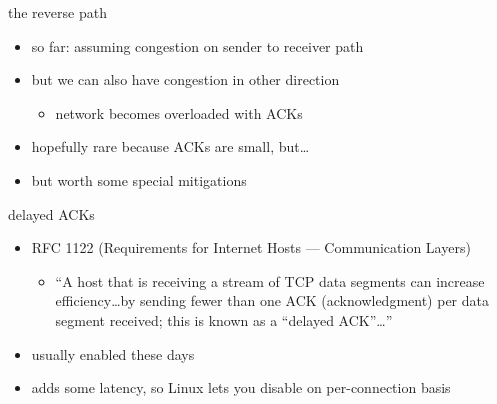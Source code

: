 \begin{frame}{the reverse path}
    \begin{itemize}
    \item so far: assuming congestion on sender to receiver path
    \item but we can also have congestion in other direction
        \begin{itemize}
        \item network becomes overloaded with ACKs
        \end{itemize}
    \item hopefully rare because ACKs are small, but\ldots
    \item but worth some special mitigations
    \end{itemize}
\end{frame}

\begin{frame}{delayed ACKs}
\begin{itemize}
\item RFC 1122 {\small(Requirements for Internet Hosts --- Communication Layers)}
    \begin{itemize}
    \item ``A host that is receiving a stream of TCP data segments can increase efficiency\ldots by sending fewer than one ACK (acknowledgment) per data segment received; this is known as a ``delayed ACK''\ldots ''
    \end{itemize}
\item usually enabled these days
\item adds some latency, so Linux lets you disable on per-connection basis
\end{itemize}
\end{frame}
